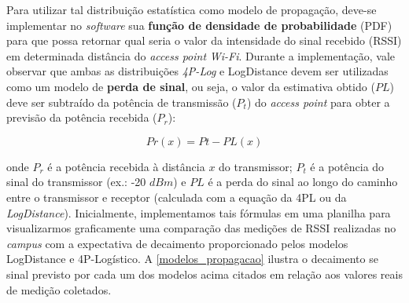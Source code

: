 \documentclass[
	12pt,				%
	twoside,			%
	a4paper,			%
	english,			%
	french,				%
	spanish,			%
	brazil				%
	]{abntex2}
\begin{document}
Para utilizar tal distribuição estatística como modelo de propagação,
deve-se implementar no \emph{software} sua \textbf{função de densidade
de probabilidade} (PDF) para que possa retornar qual seria o valor da
intensidade do sinal recebido (RSSI) em determinada distância do
\emph{access point} \emph{Wi-Fi}. Durante a implementação, vale observar
que ambas as distribuições \emph{4P-Log} e LogDistance devem ser
utilizadas como um modelo de \textbf{perda de sinal}, ou seja, o valor
da estimativa obtido (\(PL\)) deve ser subtraído da potência de
transmissão (\(P_{t}\)) do \emph{access point} para obter a previsão da
potência recebida (\(P_{r}\)):

\begin{equation}
Pr(x) = Pt - PL(x)
\end{equation}

onde \(P_{r}\) é a potência recebida à distância \(x\) do transmissor;
\(P_{t}\) é a potência do sinal do transmissor (ex.: -20 \(dBm\)) e
\(PL\) é a perda do sinal ao longo do caminho entre o transmissor e
receptor (calculada com a equação da 4PL ou da \emph{LogDistance}).
Inicialmente, implementamos tais fórmulas em uma planilha para
visualizarmos graficamente uma comparação das medições de RSSI
realizadas no \emph{campus} com a expectativa de decaimento
proporcionado pelos modelos LogDistance e 4P-Logístico. A
\autoref{modelos_propagacao} ilustra o decaimento se sinal previsto por
cada um dos modelos acima citados em relação aos valores reais de
medição coletados.
\end{document}
